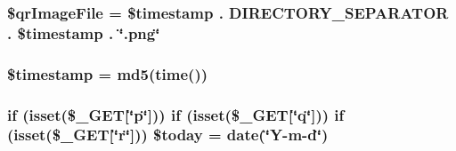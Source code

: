 \hypertarget{show_q_r_8php_ab1a38d361892b3a36e93a134278a468a}{
\subsubsection[{\$qr\-Image\-File}]{\setlength{\rightskip}{0pt plus 5cm}\$qr\-Image\-File = \$timestamp . D\-I\-R\-E\-C\-T\-O\-R\-Y\-\_\-\-S\-E\-P\-A\-R\-A\-T\-O\-R . \$timestamp . \char`\"{}.png\char`\"{}}}\label{show_q_r_8php_ab1a38d361892b3a36e93a134278a468a}
\hypertarget{show_q_r_8php_a2b69de9676dd97c675cd4d9bcceb684c}{
\subsubsection[{\$timestamp}]{\setlength{\rightskip}{0pt plus 5cm}\$timestamp = md5(time())}}\label{show_q_r_8php_a2b69de9676dd97c675cd4d9bcceb684c}
\hypertarget{show_q_r_8php_afb731abd6ad83da8867642b5796ca908}{
\subsubsection[{\$today}]{\setlength{\rightskip}{0pt plus 5cm}if (isset(\$\-\_\-\-G\-E\-T\mbox{[}\char`\"{}p\char`\"{}\mbox{]})) if (isset(\$\-\_\-\-G\-E\-T\mbox{[}\char`\"{}q\char`\"{}\mbox{]})) if (isset(\$\-\_\-\-G\-E\-T\mbox{[}\char`\"{}r\char`\"{}\mbox{]})) \$today = date(\char`\"{}Y-\/m-\/d\char`\"{})}}\label{show_q_r_8php_afb731abd6ad83da8867642b5796ca908}
